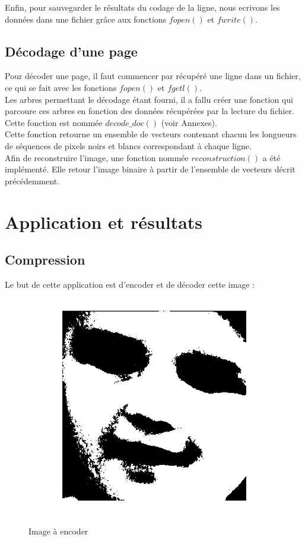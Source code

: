 \documentclass[11pt]{article}
\begin{document}
	Enfin, pour sauvegarder le résultats du codage de la ligne, nous ecrivons les données dans une fichier grâce aux fonctions $fopen()$ et $fwrite()$.
	
	\subsection{Décodage d'une page}
	
	Pour décoder une page, il faut commencer par récupéré une ligne dans un fichier, ce qui se fait avec les fonctions $fopen()$ et $fgetl()$.\\
	Les arbres permettant le décodage étant fourni, il a fallu créer une fonction qui parcoure ces arbres en fonction des données récupérées par la lecture du fichier. Cette fonction est nommée $decode\_doc()$ (voir Annexes).\\
	Cette fonction retourne un ensemble de vecteurs contenant chacun les longueurs de séquences de pixels noirs et blancs correspondant à chaque ligne.\\
	Afin de reconstruire l'image, une fonction nommée $reconstruction()$ a été implémenté. Elle retour l'image binaire à partir de l'ensemble de vecteurs décrit précédemment.

\section{Application et résultats}
	
	\subsection{Compression}
	
	Le but de cette application est d'encoder et de décoder cette image :
	
		\begin{figure}[H]
			\centering
			\includegraphics[scale=0.6]{img/img_ori.png}
			\caption{Image à encoder}
			\label{img1}
		\end{figure}
	
\end{document}
